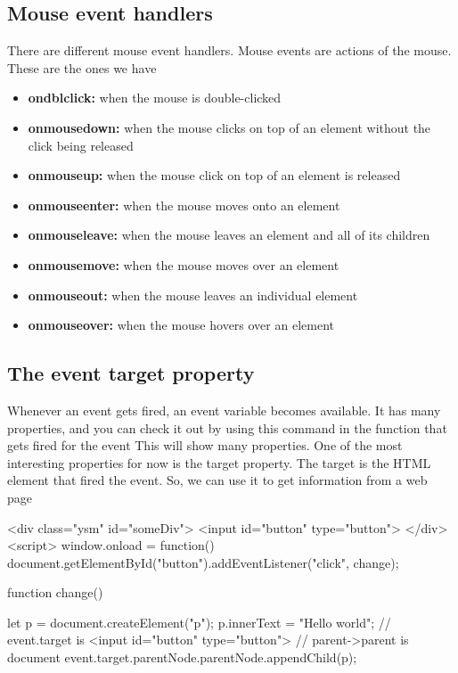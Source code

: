 \documentclass{report}
\begin{document}
\begin{jscode}
\subsection{Mouse event handlers}
\bigbreak \noindent 
There are different mouse event handlers. Mouse events are actions of the mouse.
These are the ones we have
\begin{itemize}
    \item \textbf{ondblclick:} when the mouse is double-clicked
    \item \textbf{onmousedown:} when the mouse clicks on top of an element without the click being released
    \item \textbf{onmouseup:} when the mouse click on top of an element is released
    \item \textbf{onmouseenter:} when the mouse moves onto an element
    \item \textbf{onmouseleave:} when the mouse leaves an element and all of its children
    \item \textbf{onmousemove:} when the mouse moves over an element
    \item \textbf{onmouseout:} when the mouse leaves an individual element
    \item \textbf{onmouseover:} when the mouse hovers over an element
\end{itemize}

\bigbreak \noindent 
\subsection{The event target property}
\bigbreak \noindent 
Whenever an event gets fired, an event variable becomes available. It has many
properties, and you can check it out by using this command in the function that
gets fired for the event
\bigbreak \noindent 
This will show many properties. One of the most interesting properties for now is the
target property. The target is the HTML element that fired the event. So, we can use
it to get information from a web page
\bigbreak \noindent 
\begin{jscode}
    <div class="ysm" id="someDiv">  
        <input id="button" type="button">
    </div>
    <script> 
        window.onload = function() {
            document.getElementById("button").addEventListener("click", change);
        }

        function change() {
            let p = document.createElement("p");
            p.innerText = "Hello world";
            // event.target is <input id="button" type="button">
            // parent->parent is document
            event.target.parentNode.parentNode.appendChild(p);

}
\end{jscode}
\end{jscode}
\end{document}
